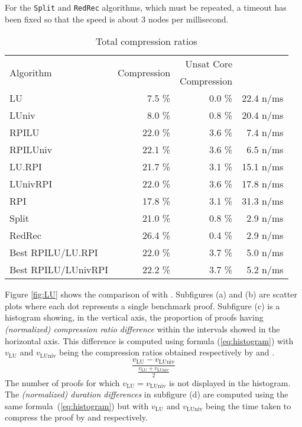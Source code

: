 \documentclass{llncs}
\begin{document}
For the \texttt{Split} and \texttt{RedRec} algorithms, which must be repeated, a timeout has
been fixed so that the speed is about 3 nodes per millisecond. 


\begin{table}[tb]
  \caption{Total compression ratios}
  \label{tab:average}
  \centering
  \begin{tabular}{lrrr}
    \toprule
    \multirow{2}{*}{Algorithm} & \multirow{2}{*}{Compression} & Unsat Core    & \phantom{.........}\multirow{2}{*}{Speed} \\
                                             &                                               & \phantom{...}Compression &        \\
    \midrule
    LU                &  7.5 \% &  0.0 \% & 22.4 n/ms \\
    LUniv             &  8.0 \% &  0.8 \% & 20.4 n/ms \\
    RPILU             & 22.0 \% &  3.6 \% &  7.4 n/ms \\
    RPILUniv          & 22.1 \% &  3.6 \% &  6.5 n/ms \\
    LU.RPI            & 21.7 \% &  3.1 \% & 15.1 n/ms \\
    LUnivRPI          & 22.0 \% &  3.6 \% & 17.8 n/ms \\
    RPI               & 17.8 \% &  3.1 \% & 31.3 n/ms \\
    Split             & 21.0 \% &  0.8 \% &  2.9 n/ms \\
    RedRec            & 26.4 \% &  0.4 \% &  2.9 n/ms \\
    Best RPILU/LU.RPI       & 22.0 \% &  3.7 \% &  5.0 n/ms \\
    Best RPILU/LUnivRPI & 22.2 \% &  3.7 \% &  5.2 n/ms \\
    \bottomrule
  \end{tabular}
\end{table}

\newcommand{\va}[1]{\ensuremath{v_{\text{#1}}}}

Figure \ref{fig:LU} shows the comparison of {\LowerUnits} with {\LowerUnivalents}. Subfigures (a) and (b) are scatter plots where each dot represents a single benchmark proof. 
Subfigure (c) is a histogram showing, in the vertical axis, the proportion of proofs having \emph{(normalized) compression ratio difference} within the intervals showed in the horizontal axis. This difference is computed using formula (\ref{eq:histogram}) with \va{LU}
and \va{LUniv} being the compression ratios obtained respectively by {\LowerUnits} and
{\LowerUnivalents}.
\begin{equation} \label{eq:histogram}
  \frac { \va{LU} - \va{LUniv} }{ \frac{\va{LU} + \va{LUniv}}{2} }
\end{equation}
The number of proofs for which $\va{LU} = \va{LUniv}$ is not displayed in the histogram.
The \emph{(normalized) duration differences} in subfigure (d) are computed using the same formula~(\ref{eq:histogram}) but
with \va{LU} and \va{LUniv} being the time taken to compress the proof by {\LowerUnits} and
{\LowerUnivalents} respectively.
\end{document}
